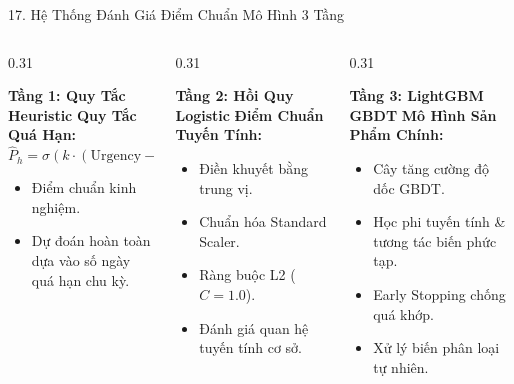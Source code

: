 \documentclass[aspectratio=169, 10pt]{beamer}
\begin{document}
\begin{frame}{17. Hệ Thống Đánh Giá Điểm Chuẩn Mô Hình 3 Tầng}
  \begin{columns}[T]
    \begin{column}{0.31\textwidth}
      \begin{block}{\textbf{Tầng 1: Quy Tắc Heuristic}}
        \textbf{Quy Tắc Quá Hạn:}
        \[
          \hat{P}_h = \sigma(k \cdot (\text{Urgency} - 0.8))
        \]
        \begin{itemize}\setlength{\itemsep}{2pt}
          \item Điểm chuẩn kinh nghiệm.
          \item Dự đoán hoàn toàn dựa vào số ngày quá hạn chu kỳ.
        \end{itemize}
      \end{block}
    \end{column}
    \begin{column}{0.31\textwidth}
      \begin{block}{\textbf{Tầng 2: Hồi Quy Logistic}}
        \textbf{Điểm Chuẩn Tuyến Tính:}
        \begin{itemize}\setlength{\itemsep}{2pt}
          \item Điền khuyết bằng trung vị.
          \item Chuẩn hóa Standard Scaler.
          \item Ràng buộc L2 ($C=1.0$).
          \item Đánh giá quan hệ tuyến tính cơ sở.
        \end{itemize}
      \end{block}
    \end{column}
    \begin{column}{0.31\textwidth}
      \begin{block}{\textbf{Tầng 3: LightGBM GBDT}}
        \textbf{Mô Hình Sản Phẩm Chính:}
        \begin{itemize}\setlength{\itemsep}{2pt}
          \item Cây tăng cường độ dốc GBDT.
          \item Học phi tuyến tính \& tương tác biến phức tạp.
          \item Early Stopping chống quá khớp.
          \item Xử lý biến phân loại tự nhiên.
        \end{itemize}
      \end{block}
    \end{column}
  \end{columns}
\end{frame}
\end{document}
